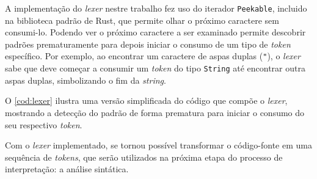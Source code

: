 A implementação do \textit{lexer} nestre trabalho fez uso do iterador \texttt{Peekable}, incluido na biblioteca padrão de Rust, que permite olhar o próximo caractere sem consumi-lo. Podendo ver o próximo caractere a ser examinado permite descobrir padrões prematuramente para depois iniciar o consumo de um tipo de \textit{token} específico. Por exemplo, ao encontrar um caractere de aspas duplas (\texttt{"}), o \textit{lexer} sabe que deve começar a consumir um \textit{token} do tipo \texttt{String} até encontrar outra aspas duplas, simbolizando o fim da \textit{string}.

O \autoref{cod:lexer} ilustra uma versão simplificada do código que compõe o \textit{lexer}, mostrando a detecção do padrão de forma prematura para iniciar o consumo do seu respectivo \textit{token}.

\codigoRust

\vspace{-1em}

Com o \textit{lexer} implementado, se tornou possível transformar o código-fonte em uma sequência de \textit{tokens}, que serão utilizados na próxima etapa do processo de interpretação: a análise sintática.

